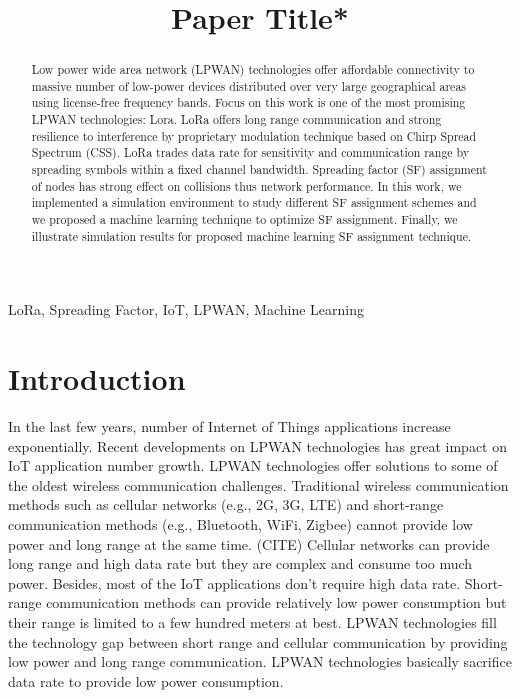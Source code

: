 \documentclass[conference]{IEEEtran}
\begin{document}
\title{Paper Title*
}


\author{
}
\maketitle


\begin{abstract}
Low power wide area network (LPWAN) technologies offer affordable connectivity to massive number of low-power devices distributed over very large geographical areas using license-free frequency bands. Focus on this work is one of the most promising LPWAN technologies: Lora. LoRa offers long range communication and strong resilience to interference by proprietary modulation technique based on Chirp Spread Spectrum (CSS). LoRa trades data rate for sensitivity and communication range by spreading symbols within a fixed channel bandwidth. Spreading factor (SF) assignment of nodes has strong effect on collisions thus network performance. In this work, we implemented a simulation environment to study different SF assignment schemes and we proposed a machine learning technique to optimize SF assignment. Finally, we illustrate simulation results for proposed machine learning SF assignment technique.
\end{abstract}


\begin{IEEEkeywords}
LoRa, Spreading Factor, IoT, LPWAN, Machine Learning
\end{IEEEkeywords}


\section{Introduction}
\par In the last few years, number of Internet of Things applications increase exponentially. \cite{7721743} Recent developments on LPWAN technologies has great impact on IoT application number growth. LPWAN technologies offer solutions to some of the oldest wireless communication challenges. Traditional wireless communication methods such as cellular networks (e.g., 2G, 3G, LTE) and short-range communication methods (e.g., Bluetooth, WiFi, Zigbee) cannot provide low power and long range at the same time. (CITE) Cellular networks can provide long range and high data rate but they are complex and consume too much power. Besides, most of the IoT applications don't require high data rate. Short-range communication methods can provide relatively low power consumption but their range is limited to a few hundred meters at best. \cite{7815384} LPWAN technologies fill the technology gap between short range and cellular communication by providing low power and long range communication. LPWAN technologies basically sacrifice data rate to provide low power consumption.
\end{document}
